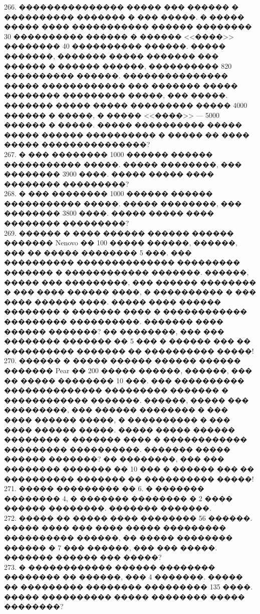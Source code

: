 \documentclass[12pt]{article}
\begin{document}
266. ��������������� ����� ��� ������ � ���������� ������� � ��� �����. � ����� ����� ���� ����������� ������ �������� 30 ���������� ������ � ������ <<����>> �������� 40 ���������� ������. ����� �������, ������� ����� ������� ��� ������ � ������ ������, ���������� 820 ���������� ������. ��������������� ����� ������������ ��� ������� ����� �������� ��������� �����, ��� �����. ������� ����� ����� ��������� ����� 4000 ������ � �����, � ����� <<����>> --- 5000 ������ � �����. ����� ���������� ����� ����� ������ ���������� � ����� �� ���� ����� ���������������?\\
267. � ��� �������� 1000 ������ ������ ����������� �����. ����� ��������, ��� �������� 3900 ����. ����� ����� ���� �������� ���������?\\
268. � ��� �������� 1000 ������ ������ ����������� �����. ����� ��������, ��� �������� 3800 ����. ����� ����� ���� �������� ���������?\\
269. ������ � ���� ������ ������ ������ ������� Nenovo �� 100 ����� ������, ������, ��� �� ����� �������� 5 ���. ��� ���������� �������������� ��������� ������� � ������������ �������. ������, ����� ��� ���������, ��� ������ �������� � ��� ���� ������ ����, � ���������� � ��� ���� ������ ����. ����� ���� ������ �������� � ������� ���� � ������������ ��������� ����������. ������� ���� ������ �������? �� ��������, ��� ��� �������� ������� �� 5 ��� � ������ ��� �� ���������� ������� �� ���������� �����!\\
270. ������ � ����� ������ ������ ������ ������� Pear �� 200 ����� ������, ������, ��� �� ����� �������� 10 ���. ��� ���������� �������������� ��������� ������� � ������������ �������. ������, ����� ��� ���������, ��� ������ �������� � ��� ���� ������ �����, � ���������� � ��� ���� ������ �����. ����� ����� ������ �������� � ������� ���� � ������������ ��������� ����������. ������� ����� ������ �������? �� ��������, ��� ��� �������� ������� �� 10 ��� � ������ ��� �� ���������� ������� �� ���������� �����!\\
271. ����� ��������� �� 6. � ������� �������� 4, � ������� �������� � 2 ���� ������ ��������. ������� �������.\\
272. ����� �� ����� ���� �������� 56 ������. ����� ���� ��� ���� ����� ��������� ���������� ������, �� ����� �������� ������ � 7 ��� ������, ��� ��� �����. ������� ������ ��� �����?\\
273. � ������������ ������ �������� �������� �� ������, ��� 4 �������. ����� �� ��������� �������� ��������� 135 ����. ����� ���������� ����� �������� ����� ��������?\\
\end{document}
